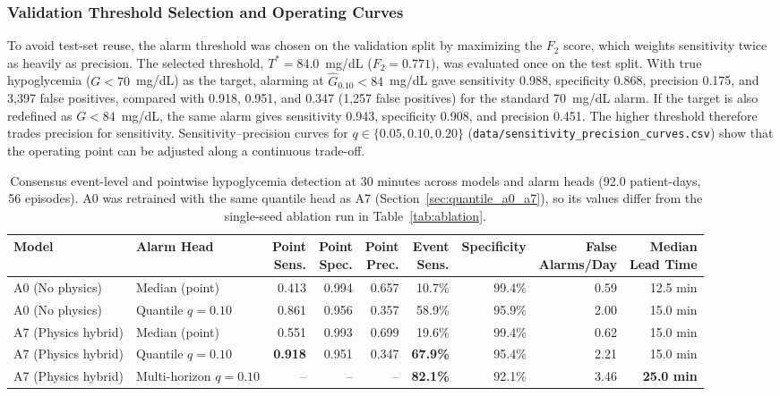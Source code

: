 \documentclass[journal]{IEEEtran}
\begin{document}
\subsubsection{Validation Threshold Selection and Operating Curves}
\label{sec:validation_threshold_selection}
To avoid test-set reuse, the alarm threshold was chosen on the validation split by maximizing the $F_2$ score, which weights sensitivity twice as heavily as precision. The selected threshold, $T^* = 84.0$~mg/dL ($F_2 = 0.771$), was evaluated once on the test split. With true hypoglycemia ($G < 70$~mg/dL) as the target, alarming at $\hat{G}_{0.10} < 84$~mg/dL gave sensitivity 0.988, specificity 0.868, precision 0.175, and 3,397 false positives, compared with 0.918, 0.951, and 0.347 (1,257 false positives) for the standard 70~mg/dL alarm. If the target is also redefined as $G < 84$~mg/dL, the same alarm gives sensitivity 0.943, specificity 0.908, and precision 0.451. The higher threshold therefore trades precision for sensitivity. Sensitivity--precision curves for $q \in \{0.05, 0.10, 0.20\}$ (\texttt{data/sensitivity\_precision\_curves.csv}) show that the operating point can be adjusted along a continuous trade-off.

\begin{table}[t]
\centering
\caption{Consensus event-level and pointwise hypoglycemia detection at 30 minutes across models and alarm heads (92.0 patient-days, 56 episodes). A0 was retrained with the same quantile head as A7 (Section~\ref{sec:quantile_a0_a7}), so its values differ from the single-seed ablation run in Table~\ref{tab:ablation}.}
\label{tab:hypo_event}
\footnotesize
\begin{tabular}{llrrrrrrr}
\toprule
Model & Alarm Head & \makecell{Point\\Sens.} & \makecell{Point\\Spec.} & \makecell{Point\\Prec.} & \makecell{Event\\Sens.} & Specificity & \makecell{False\\Alarms/Day} & \makecell{Median\\Lead Time} \\
\midrule
A0 (No physics) & Median (point) & 0.413 & 0.994 & 0.657 & 10.7\% & 99.4\% & 0.59 & 12.5 min \\
A0 (No physics) & Quantile $q=0.10$ & 0.861 & 0.956 & 0.357 & 58.9\% & 95.9\% & 2.00 & 15.0 min \\
\midrule
A7 (Physics hybrid) & Median (point) & 0.551 & 0.993 & 0.699 & 19.6\% & 99.4\% & 0.62 & 15.0 min \\
A7 (Physics hybrid) & Quantile $q=0.10$ & \textbf{0.918} & 0.951 & 0.347 & \textbf{67.9\%} & 95.4\% & 2.21 & 15.0 min \\
A7 (Physics hybrid) & Multi-horizon $q=0.10$ & -- & -- & -- & \textbf{82.1\%} & 92.1\% & 3.46 & \textbf{25.0 min} \\
\bottomrule
\end{tabular}
\end{table}
\end{document}

